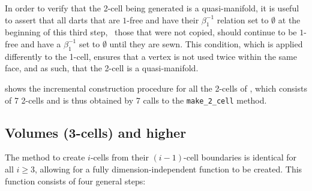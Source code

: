 \begin{enumerate}
In order to verify that the 2-cell being generated is a quasi-manifold, it is useful to assert that all darts that are $1$-free and have their $\beta_1^{-1}$ relation set to $\emptyset$ at the beginning of this third step, \ie\ those that were not copied, should continue to be $1$-free and have a $\beta_1^{-1}$ set to $\emptyset$ until they are sewn.
This condition, which is applied differently to the 1-cell, ensures that a vertex is not used twice within the same face, and as such, that the 2-cell is a quasi-manifold.

\end{enumerate}

 shows the incremental construction procedure for all the 2-cells of , which consists of 7 2-cells and is thus obtained by 7 calls to the \texttt{make\_2\_cell} method.

\subsection{Volumes (3-cells) and higher}
\label{ss:incremental-volumes}

The method to create $i$-cells from their $(i-1)$-cell boundaries is identical for all $i \geq 3$, allowing for a fully dimension-independent function to be created.
This function consists of four general steps:

